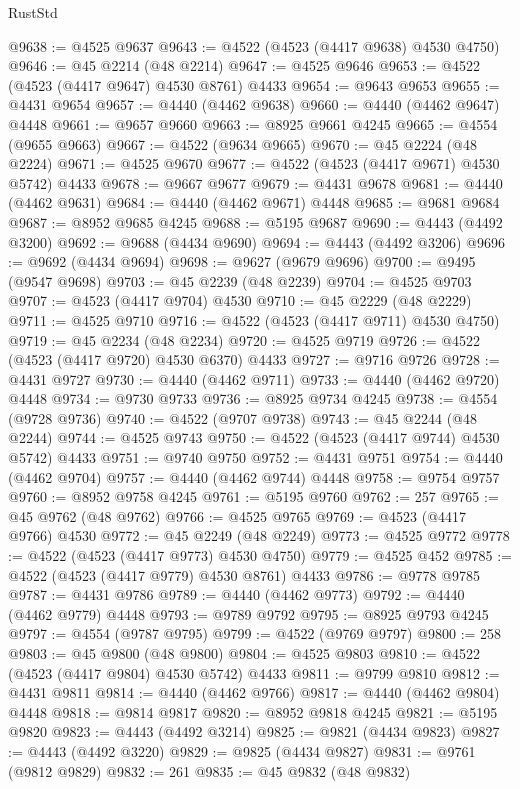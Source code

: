 \begin{lexlean}{RustStd}
\begin{coremodule}
{\begin{coremodule}
{{{{{{{{{{{{{{{{{{{{{{{{{{{{{{{{{{{{{{{{{{{{{{{{{{{{{{{{{{{{@9638 := @4525 @9637
@9643 := @4522 (@4523 (@4417 @9638) @4530 @4750)
@9646 := @45 @2214 (@48 @2214)
@9647 := @4525 @9646
@9653 := @4522 (@4523 (@4417 @9647) @4530 @8761) @4433
@9654 := @9643 @9653
@9655 := @4431 @9654
@9657 := @4440 (@4462 @9638)
@9660 := @4440 (@4462 @9647) @4448
@9661 := @9657 @9660
@9663 := @8925 @9661 @4245
@9665 := @4554 (@9655 @9663)
@9667 := @4522 (@9634 @9665)
@9670 := @45 @2224 (@48 @2224)
@9671 := @4525 @9670
@9677 := @4522 (@4523 (@4417 @9671) @4530 @5742) @4433
@9678 := @9667 @9677
@9679 := @4431 @9678
@9681 := @4440 (@4462 @9631)
@9684 := @4440 (@4462 @9671) @4448
@9685 := @9681 @9684
@9687 := @8952 @9685 @4245
@9688 := @5195 @9687
@9690 := @4443 (@4492 @3200)
@9692 := @9688 (@4434 @9690)
@9694 := @4443 (@4492 @3206)
@9696 := @9692 (@4434 @9694)
@9698 := @9627 (@9679 @9696)
@9700 := @9495 (@9547 @9698)
@9703 := @45 @2239 (@48 @2239)
@9704 := @4525 @9703
@9707 := @4523 (@4417 @9704) @4530
@9710 := @45 @2229 (@48 @2229)
@9711 := @4525 @9710
@9716 := @4522 (@4523 (@4417 @9711) @4530 @4750)
@9719 := @45 @2234 (@48 @2234)
@9720 := @4525 @9719
@9726 := @4522 (@4523 (@4417 @9720) @4530 @6370) @4433
@9727 := @9716 @9726
@9728 := @4431 @9727
@9730 := @4440 (@4462 @9711)
@9733 := @4440 (@4462 @9720) @4448
@9734 := @9730 @9733
@9736 := @8925 @9734 @4245
@9738 := @4554 (@9728 @9736)
@9740 := @4522 (@9707 @9738)
@9743 := @45 @2244 (@48 @2244)
@9744 := @4525 @9743
@9750 := @4522 (@4523 (@4417 @9744) @4530 @5742) @4433
@9751 := @9740 @9750
@9752 := @4431 @9751
@9754 := @4440 (@4462 @9704)
@9757 := @4440 (@4462 @9744) @4448
@9758 := @9754 @9757
@9760 := @8952 @9758 @4245
@9761 := @5195 @9760
@9762 := 257
@9765 := @45 @9762 (@48 @9762)
@9766 := @4525 @9765
@9769 := @4523 (@4417 @9766) @4530
@9772 := @45 @2249 (@48 @2249)
@9773 := @4525 @9772
@9778 := @4522 (@4523 (@4417 @9773) @4530 @4750)
@9779 := @4525 @452
@9785 := @4522 (@4523 (@4417 @9779) @4530 @8761) @4433
@9786 := @9778 @9785
@9787 := @4431 @9786
@9789 := @4440 (@4462 @9773)
@9792 := @4440 (@4462 @9779) @4448
@9793 := @9789 @9792
@9795 := @8925 @9793 @4245
@9797 := @4554 (@9787 @9795)
@9799 := @4522 (@9769 @9797)
@9800 := 258
@9803 := @45 @9800 (@48 @9800)
@9804 := @4525 @9803
@9810 := @4522 (@4523 (@4417 @9804) @4530 @5742) @4433
@9811 := @9799 @9810
@9812 := @4431 @9811
@9814 := @4440 (@4462 @9766)
@9817 := @4440 (@4462 @9804) @4448
@9818 := @9814 @9817
@9820 := @8952 @9818 @4245
@9821 := @5195 @9820
@9823 := @4443 (@4492 @3214)
@9825 := @9821 (@4434 @9823)
@9827 := @4443 (@4492 @3220)
@9829 := @9825 (@4434 @9827)
@9831 := @9761 (@9812 @9829)
@9832 := 261
@9835 := @45 @9832 (@48 @9832)
}}}}}}}}}}}}}}}}}}}}}}}}}}}}}}}}}}}}}}}}}}}}}}}}}}}}}}}}}}}}
\end{coremodule}}
\end{coremodule}
\end{lexlean}
